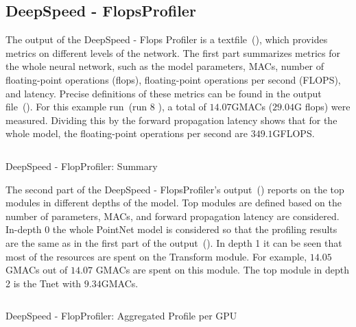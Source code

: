 \documentclass[12pt, a4paper, hidelinks]{article}
\begin{document}
\subsection{DeepSpeed - FlopsProfiler}
\label{sec:r-flopsprofiler}

The output of the DeepSpeed - Flops Profiler is a textfile~(), which provides metrics on different levels of the network. The first part summarizes metrics for the whole neural network, such as the model parameters, \ac{MACs}, number of floating-point operations (flops), floating-point operations per second (FLOPS), and latency. Precise definitions of these metrics can be found in the output file~(). For this example run~(run 8 ), a total of $14.07$GMACs ($29.04$G flops) were measured. Dividing this by the forward propagation latency shows that for the whole model, the floating-point operations per second are $349.1$GFLOPS.

\begin{listing}[H]
\inputminted[xleftmargin=1em,linenos,fontsize=\small, firstline=2,lastline=16, breaklines]{python}{./assets/scap_gtx1080_deepspeed_14615344_4294967294_one-epoch.txt}
\caption{DeepSpeed - FlopProfiler: Summary}
\label{lst:scap_gtx1080_deepspeed_14615344_4294967294_one-epoch-summary}
\end{listing}

The second part of the DeepSpeed - FlopsProfiler's output~() reports on the top modules in different depths of the model. Top modules are defined based on the number of parameters, \ac{MACs}, and forward propagation latency are considered. In-depth 0 the whole PointNet model is considered so that the profiling results are the same as in the first part of the output~().
In depth 1 it can be seen that most of the resources are spent on the Transform module. For example, $14.05$ GMACs out of $14.07$ GMACs are spent on this module.
The top module in depth 2 is the Tnet with $9.34$GMACs.

\begin{listing}[H]
\inputminted[xleftmargin=1em,linenos,fontsize=\small, firstline=19,lastline=31, breaklines]{python}{./assets/scap_gtx1080_deepspeed_14615344_4294967294_one-epoch.txt}
\caption{DeepSpeed - FlopProfiler: Aggregated Profile per GPU}
\label{lst:scap_gtx1080_deepspeed_14615344_4294967294_one-epoch-aggregated}
\end{listing}
\end{document}
